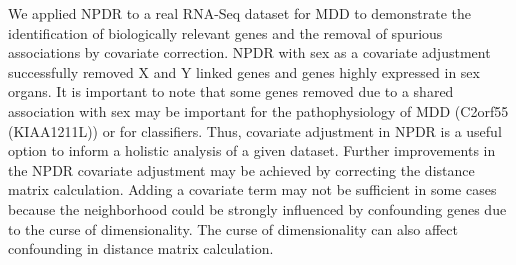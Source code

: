 \documentclass[10pt]{article}
\begin{document}
We applied NPDR to a real RNA-Seq dataset for MDD to demonstrate the identification of biologically relevant genes and the removal of spurious associations by covariate correction. NPDR with sex as a covariate adjustment successfully removed X and Y linked genes and genes highly expressed in sex organs. It is important to note that some genes removed due to a shared association with sex may be important for the pathophysiology of MDD (C2orf55 (KIAA1211L)) or for classifiers.  Thus, covariate adjustment in NPDR is a useful option to inform a holistic analysis of a given dataset. Further improvements in the NPDR covariate adjustment may be achieved by correcting the distance matrix calculation. Adding a covariate term may not be sufficient in some cases because the neighborhood could be strongly influenced by confounding genes due to the curse of dimensionality. The curse of dimensionality can also affect confounding in distance matrix calculation.



%
\end{document}
